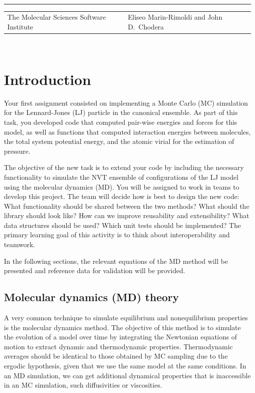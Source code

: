 \documentclass[aip,jcp,preprint,superscriptaddress,floatfix]{revtex4-1}
\renewcommand{\title}[1]{\textbf{\large{#1}}\\}
\newcommand{\leftright}[2]{\begin{tabularx}{\textwidth}{X>{\raggedleft}X}#1%
& #2\\\end{tabularx}\\[-1cm]}
\begin{document}
\title{ }
\rule{\textwidth}{1pt}
\leftright{The Molecular Sciences Software Institute}{Eliseo Marin-Rimoldi and John D.~Chodera} %

\bigskip

\section{Introduction}

Your first assignment consisted on implementing a Monte Carlo (MC) simulation
for the Lennard-Jones (LJ) particle in the canonical ensemble. 
As part of this task,
you developed code that computed pair-wise energies and forces for this model, 
as well as functions that computed interaction energies between molecules,
the total system potential energy, and the atomic virial for the estimation of pressure.

The objective of the new task is to extend your code by including the
necessary functionality to simulate the NVT ensemble of configurations 
of the LJ model using the molecular dynamics (MD). You will be 
assigned to work in teams to develop this project. The team will
decide how is best to design the new code: What functionality should be shared
between the two methods? What should the library should look like? How can
we improve reusability and extensibility? What data
structures should be used? Which unit tests should be implemented?
The primary learning goal of this activity is to think about interoperability and teamwork.

In the following sections, the relevant equations of the MD 
method will be presented and reference data for validation will be provided.

\subsection{Molecular dynamics (MD) theory}

A very common technique to simulate equilibrium and nonequilibrium
properties is the molecular dynamics method. 
The objective of this method is to simulate the evolution of a model over time
by integrating the Newtonian equations of motion to 
extract dynamic and thermodynamic properties. Thermodynamic
averages should be identical to those obtained by MC sampling
due to the ergodic hypothesis, given that we use the same model at the
same conditions. In an MD simulation, we can get additional dynamical
properties that is inaccessible in an MC simulation, such diffusivities or 
viscosities. 
\end{document}
